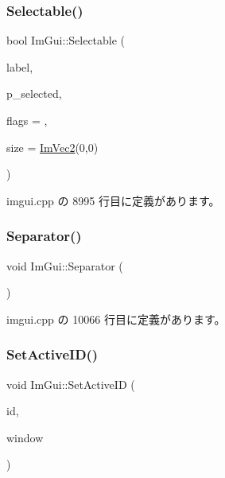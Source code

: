 \subsubsection{\texorpdfstring{Selectable()}{Selectable()}\hspace{0.1cm}{\footnotesize\ttfamily [2/2]}}
{\footnotesize\ttfamily bool Im\+Gui\+::\+Selectable (\begin{DoxyParamCaption}\item[{const char $\ast$}]{label,  }\item[{bool $\ast$}]{p\+\_\+selected,  }\item[{\mbox{\hyperlink{imgui_8h_aab0fe56421d75949dedfbfbbaa674b6b}{Im\+Gui\+Selectable\+Flags}}}]{flags = {},  }\item[{const \mbox{\hyperlink{struct_im_vec2}{Im\+Vec2}} \&}]{size = {\ttfamily \mbox{\hyperlink{struct_im_vec2}{Im\+Vec2}}(0,0)} }\end{DoxyParamCaption})}



 imgui.\+cpp の 8995 行目に定義があります。

\mbox{\label{namespace_im_gui_a191123597a5084d003c8beac7eeb029e}} 
\subsubsection{\texorpdfstring{Separator()}{Separator()}}
{\footnotesize\ttfamily void Im\+Gui\+::\+Separator (\begin{DoxyParamCaption}{ }\end{DoxyParamCaption})}



 imgui.\+cpp の 10066 行目に定義があります。

\mbox{\label{namespace_im_gui_a27b8ace13a8c421ee8405f0cbebe4ead}} 
\subsubsection{\texorpdfstring{Set\+Active\+I\+D()}{SetActiveID()}}
{\footnotesize\ttfamily void Im\+Gui\+::\+Set\+Active\+ID (\begin{DoxyParamCaption}\item[{\mbox{\hyperlink{imgui_8h_a1785c9b6f4e16406764a85f32582236f}{Im\+Gui\+ID}}}]{id,  }\item[{\mbox{\hyperlink{struct_im_gui_window}{Im\+Gui\+Window}} $\ast$}]{window }\end{DoxyParamCaption})}



